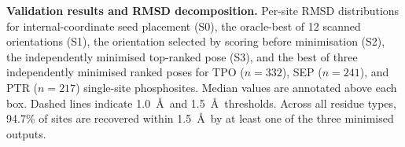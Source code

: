 \caption{\textbf{Validation results and RMSD decomposition.} Per-site RMSD distributions for internal-coordinate seed placement (S0), the oracle-best of 12 scanned orientations (S1), the orientation selected by scoring before minimisation (S2), the independently minimised top-ranked pose (S3), and the best of three independently minimised ranked poses for TPO ($n=332$), SEP ($n=241$), and PTR ($n=217$) single-site phosphosites. Median values are annotated above each box. Dashed lines indicate 1.0~\AA\ and 1.5~\AA\ thresholds. Across all residue types, 94.7\% of sites are recovered within 1.5~\AA\ by at least one of the three minimised outputs.}
